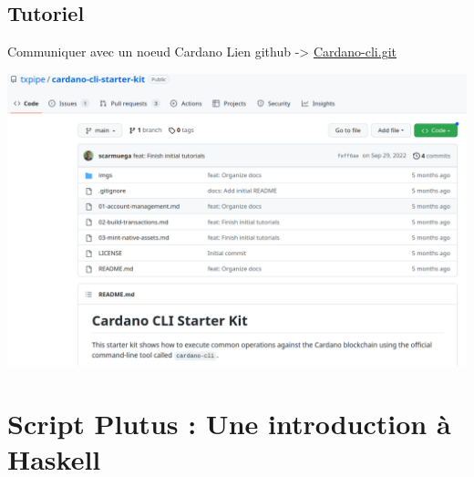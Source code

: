 \documentclass[presentation]{beamer}
\begin{document}
\subsection{Tutoriel}
\label{sec:org644d296}
\begin{frame}[label={sec:org7c61081}]{Communiquer avec un noeud Cardano}
Lien github -> \href{https://github.com/txpipe/cardano-cli-starter-kit}{Cardano-cli.git}
\begin{center}
\includegraphics[height=.7\textheight]{Images/tuto_cardano_cli.png}
\end{center}
\end{frame}

\section{Script Plutus : Une introduction à Haskell}
\label{sec:org8bdf76f}
\end{document}
